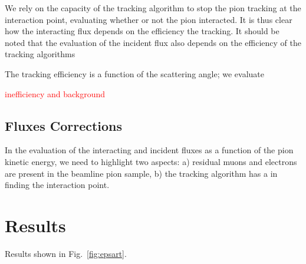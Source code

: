 \documentclass[aps,prl,twocolumn,showpacs,superscriptaddress,groupedaddress]{revtex4}  %
\begin{document}
We rely on the capacity of the tracking algorithm to stop the pion tracking at the interaction point, evaluating whether or not the pion interacted. It is thus clear how the interacting flux depends on the efficiency the tracking. It should be noted that the evaluation of the incident flux also depends on the efficiency of the tracking algorithms

The tracking efficiency is a function of the scattering angle; we evaluate 

\textcolor{red}{inefficiency and background}

 


\subsection{\label{sec:Corrections}Fluxes Corrections}
In the evaluation of the interacting and incident fluxes as a function of the pion kinetic energy, we need to highlight two aspects: a) residual muons and electrons are present in the beamline pion sample, b) the tracking algorithm has a in finding the interaction point.

\section{\label{sec:Results}Results}
Results shown in Fig.~\ref{fig:epsart}.
\end{document}

